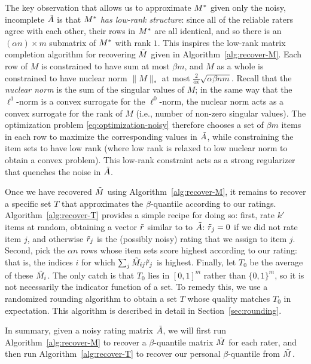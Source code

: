 The key observation that allows us to approximate $M^*$ given only the noisy, 
incomplete $\tilde{A}$ is that \emph{$M^*$ has low-rank structure}: since all 
of the reliable raters agree with each other, their rows in $M^*$ are all 
identical, and so there is an $(\alpha n) \times m$ submatrix of $M^*$ with 
rank $1$. This inspires the low-rank matrix completion algorithm for recovering 
$\tilde{M}$ given in Algorithm~\ref{alg:recover-M}. Each row of $M$ is constrained 
to have sum at most $\beta m$, and $M$ as a whole is constrained to have 
nuclear norm $\|M\|_*$ at most $\frac{2}{\alpha \epsilon}\sqrt{\alpha\beta nm}$. 
Recall that the \emph{nuclear norm} is the sum of the singular values of 
$M$; in the same way that the $\ell^1$-norm is a convex surrogate for the 
$\ell^0$-norm, the nuclear norm acts as a convex surrogate for the rank of $M$ 
(i.e., number of non-zero singular values). The optimization problem 
\eqref{eq:optimization-noisy} therefore chooses a set of $\beta m$ items in each 
row to maximize the corresponding values in $\tilde{A}$, while constraining the item 
sets to have low rank (where low rank is relaxed to low nuclear norm to obtain 
a convex problem). 
This low-rank constraint acts as a strong regularizer that quenches the noise 
in $\tilde{A}$.



Once we have recovered $\tilde{M}$ using Algorithm~\ref{alg:recover-M}, it remains to 
recover a specific set $T$ that approximates the $\beta$-quantile according to 
our ratings. Algorithm~\ref{alg:recover-T} provides a simple recipe for doing so: 
first, rate $k'$ items at random, obtaining a vector $\tilde{r}$ similar to to 
$\tilde{A}$: $\tilde{r}_j = 0$ if we did not rate item $j$, and otherwise $\tilde{r}_j$ is 
the (possibly noisy) rating that we assign to item $j$. Second, pick the 
$\alpha n$ rows whose item sets score highest according to our rating: that is, 
the indices $i$ for which $\sum_j \tilde{M}_{ij}\tilde{r}_j$ is highest. Finally, let 
$T_0$ be the average of these $\tilde{M}_i$. The only catch is that $T_0$ lies in 
$[0,1]^m$ rather than $\{0,1\}^m$, so it is not necessarily the indicator 
function of a set. To remedy this, we use a randomized rounding algorithm to 
obtain a set $T$ whose quality matches $T_0$ in expectation. This algorithm 
is described in detail in Section~\ref{sec:rounding}.

In summary, given a noisy rating matrix $\tilde{A}$, we will first run 
Algorithm~\ref{alg:recover-M} to recover a $\beta$-quantile matrix $\tilde{M}$ for 
each rater, and then run Algorithm~\ref{alg:recover-T} to recover our 
personal $\beta$-quantile from $\tilde{M}$.

